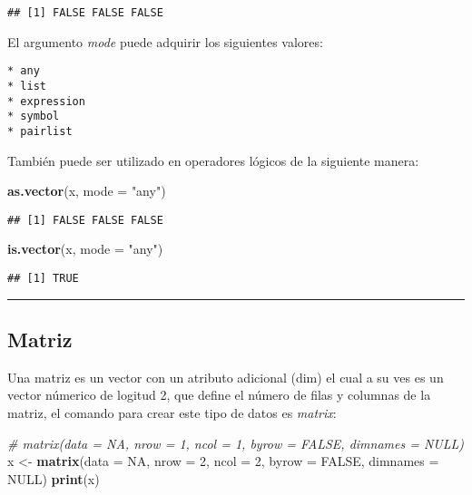 \documentclass[11pt,]{article}
\newenvironment{Shaded}{\begin{snugshade}}{\end{snugshade}}
\newcommand{\CommentTok}[1]{\textcolor[rgb]{0.56,0.35,0.01}{\textit{#1}}}
\newcommand{\DataTypeTok}[1]{\textcolor[rgb]{0.13,0.29,0.53}{#1}}
\newcommand{\DecValTok}[1]{\textcolor[rgb]{0.00,0.00,0.81}{#1}}
\newcommand{\KeywordTok}[1]{\textcolor[rgb]{0.13,0.29,0.53}{\textbf{#1}}}
\newcommand{\NormalTok}[1]{#1}
\newcommand{\OtherTok}[1]{\textcolor[rgb]{0.56,0.35,0.01}{#1}}
\newcommand{\StringTok}[1]{\textcolor[rgb]{0.31,0.60,0.02}{#1}}
\begin{document}
\begin{verbatim}
## [1] FALSE FALSE FALSE
\end{verbatim}

El argumento \emph{mode} puede adquirir los siguientes valores:

\begin{verbatim}
* any
* list
* expression
* symbol
* pairlist
\end{verbatim}

También puede ser utilizado en operadores lógicos de la siguiente
manera:

\begin{Shaded}
\begin{Highlighting}[]
\KeywordTok{as.vector}\NormalTok{(x, }\DataTypeTok{mode =} \StringTok{"any"}\NormalTok{)}
\end{Highlighting}
\end{Shaded}

\begin{verbatim}
## [1] FALSE FALSE FALSE
\end{verbatim}

\begin{Shaded}
\begin{Highlighting}[]
\KeywordTok{is.vector}\NormalTok{(x, }\DataTypeTok{mode =} \StringTok{"any"}\NormalTok{)}
\end{Highlighting}
\end{Shaded}

\begin{verbatim}
## [1] TRUE
\end{verbatim}

\begin{center}\rule{0.5\linewidth}{0.5pt}\end{center}

\hypertarget{matriz}{%
\subsection{Matriz}\label{matriz}}

Una matriz es un vector con un atributo adicional (dim) el cual a su ves
es un vector númerico de logitud 2, que define el número de filas y
columnas de la matriz, el comando para crear este tipo de datos es
\emph{matrix}:

\begin{Shaded}
\begin{Highlighting}[]
\CommentTok{# matrix(data = NA, nrow = 1, ncol = 1, byrow = FALSE, dimnames = NULL)}
\NormalTok{x <-}\StringTok{ }\KeywordTok{matrix}\NormalTok{(}\DataTypeTok{data =} \OtherTok{NA}\NormalTok{, }\DataTypeTok{nrow =} \DecValTok{2}\NormalTok{, }\DataTypeTok{ncol =} \DecValTok{2}\NormalTok{, }\DataTypeTok{byrow =} \OtherTok{FALSE}\NormalTok{, }\DataTypeTok{dimnames =} \OtherTok{NULL}\NormalTok{)}
\KeywordTok{print}\NormalTok{(x)}
\end{Highlighting}
\end{Shaded}
\end{document}
